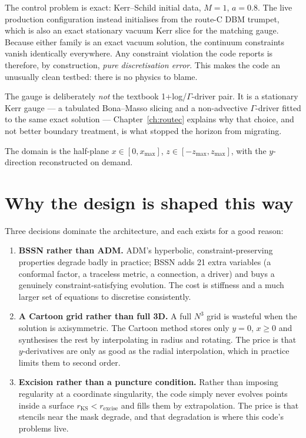 \documentclass[11pt,openany]{book}
\begin{document}
The control problem is exact: Kerr--Schild initial data, $M=1$, $a=0.8$. The
live production configuration instead initialises from the route-C DBM
trumpet, which is also an exact stationary vacuum Kerr slice for the matching
gauge. Because either family is an exact vacuum solution, the continuum
constraints vanish identically everywhere. Any constraint violation the code reports is therefore, by
construction, \emph{pure discretisation error}. This makes the code an
unusually clean testbed: there is no physics to blame.

The gauge is deliberately \emph{not} the textbook 1+log/$\Gamma$-driver pair.
It is a stationary Kerr gauge --- a tabulated Bona--Masso slicing and a
non-advective $\Gamma$-driver fitted to the same exact solution ---
Chapter~\ref{ch:routec} explains why that choice, and not better boundary
treatment, is what stopped the horizon from migrating.

The domain is the half-plane $x \in [0, x_{\max}]$, $z \in [-z_{\max},
z_{\max}]$, with the $y$-direction reconstructed on demand.

\section{Why the design is shaped this way}

Three decisions dominate the architecture, and each exists for a good reason:

\begin{enumerate}
\item \textbf{BSSN rather than ADM.} ADM's hyperbolic, constraint-preserving
      properties degrade badly in practice; BSSN adds 21 extra variables (a
      conformal factor, a traceless metric, a connection, a driver) and buys a
      genuinely constraint-satisfying evolution. The cost is stiffness and a
      much larger set of equations to discretise consistently.
\item \textbf{A Cartoon grid rather than full 3D.} A full
      $N^3$ grid is wasteful when the solution is axisymmetric. The Cartoon
      method stores only $y=0$, $x \geq 0$ and synthesises the rest by
      interpolating in radius and rotating. The price is that $y$-derivatives
      are only as good as the radial interpolation, which in practice limits
      them to second order.
\item \textbf{Excision rather than a puncture condition.} Rather than imposing
      regularity at a coordinate singularity, the code simply never evolves
      points inside a surface $r_{\mathrm{KS}} < r_{\mathrm{excise}}$ and
      fills them by extrapolation. The price is that stencils near the mask
      degrade, and that degradation is where this code's problems live.
\end{enumerate}
\end{document}
